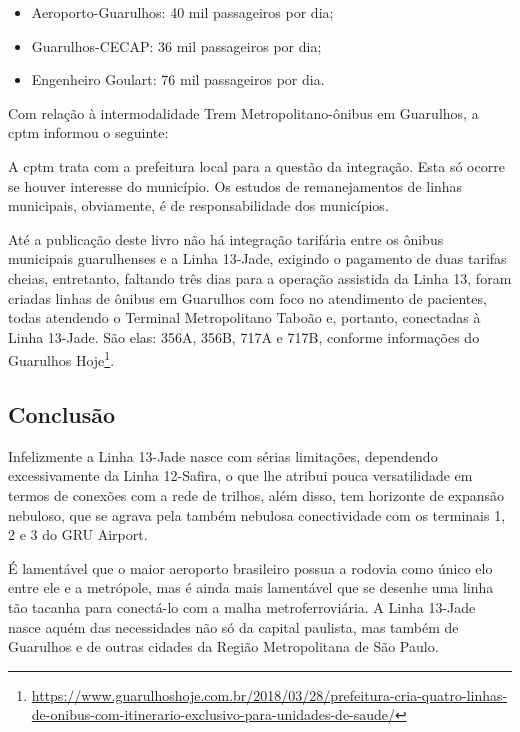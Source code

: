 \documentclass[11pt,fleqn]{book} %
\begin{document}
\begin{itemize}
	\item Aeroporto-Guarulhos: 40 mil passageiros por dia;
	\item Guarulhos-CECAP: 36 mil passageiros por dia;
	\item Engenheiro Goulart: 76 mil passageiros por dia.
\end{itemize}

Com relação à intermodalidade Trem Metropolitano-ônibus em Guarulhos, a \gls{cptm} informou o seguinte:

\begin{citacao}
	A \gls{cptm} trata com a prefeitura local para a questão da integração. Esta só ocorre se houver interesse do município. Os estudos de remanejamentos de linhas municipais, obviamente, é de responsabilidade dos municípios.
\end{citacao}

Até a publicação deste livro não há integração tarifária entre os ônibus municipais guarulhenses e a Linha 13-Jade, exigindo o pagamento de duas tarifas cheias, entretanto, faltando três dias para a operação assistida da Linha 13, foram criadas linhas de ônibus em Guarulhos com foco no atendimento de pacientes, todas atendendo o Terminal Metropolitano Taboão e, portanto, conectadas à Linha 13-Jade. São elas: 356A, 356B, 717A e 717B, conforme informações do Guarulhos Hoje\footnote{\url{https://www.guarulhoshoje.com.br/2018/03/28/prefeitura-cria-quatro-linhas-de-onibus-com-itinerario-exclusivo-para-unidades-de-saude/}}.

\subsection{Conclusão}


Infelizmente a Linha 13-Jade nasce com sérias limitações, dependendo excessivamente da Linha 12-Safira, o que lhe atribui pouca versatilidade em termos de conexões com a rede de trilhos, além disso, tem horizonte de expansão nebuloso, que se agrava pela também nebulosa conectividade com os terminais 1, 2 e 3 do GRU Airport.

É lamentável que o maior aeroporto brasileiro possua a rodovia como único elo entre ele e a metrópole, mas é ainda mais lamentável que se desenhe uma linha tão tacanha para conectá-lo com a malha metroferroviária. A Linha 13-Jade nasce aquém das necessidades não só da capital paulista, mas também de Guarulhos e de outras cidades da Região Metropolitana de São Paulo.
\end{document}
